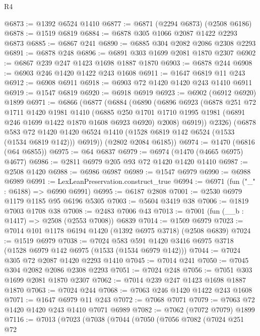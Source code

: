 \begin{lexlean}{R4}
\begin{coremodule}
@6873 := @1392 @6524 @1410
@6877 := @6871 (@2294 @6873) (@2508 @6186)
@6878 := @1519 @6819
@6884 := @6878 @305 @1066 @2087 @1422 @2293 @6873
@6885 := @6867 @241
@6890 := @6885 @304 @2082 @2086 @2308 @2293
@6891 := @6878 @248
@6896 := @6891 @303 @1699 @2081 @1870 @2307
@6902 := @6867 @239 @247 @1423 @1698 @1887 @1870
@6903 := @6878 @244
@6908 := @6903 @246 @1420 @1422 @243 @1608
@6911 := @1647 @6819 @11 @243
@6912 := @6908 @6911
@6918 := @6903 @72 @1420 @1420 @243 @1410 @6911
@6919 := @1547 @6819
@6920 := @6918 @6919
@6923 := @6902 (@6912 @6920) @1899
@6971 := @6866
    (@6877
      (@6884
        (@6890
          (@6896
            @6923
            (@6878
              @251
              @72
              @1711
              @1420
              @1981
              @1410
              (@6885
                @250
                @1701
                @1710
                @1995
                @1981
                (@6891 @246 @1699 @1422 @1870 @1608 @6923 @6920)
                @2008)
              @6919))
          @2326)
        (@6878
          @583
          @72
          @1420
          @1420
          @6524
          @1410
          (@1528 @6819 @142 @6524 (@1533 (@1534 @6819 @142)))
          @6919))
      (@2802 @2084 @6185))
@6974 := @1470 (@6816 (@64 @6855))
@6975 := @64 @6837
@6979 := @6974 (@1470 (@4665 @6975) @4677)
@6986 := @2811 @6979 @205 @93 @72 @1420 @1420 @1410
@6987 := @2508 @1420
@6988 := @6986 @6987
@6989 := @1547 @6979
@6990 := @6988 @6989
@6991 := LexLeanPreservation.construct_true
@6994 := @6971 (fun ("_" : @6188) => @6990 @6991)
@6995 := @6187 @2808
@7001 := @2530 @6979 @1179 @1185 @95 @6196 @5305
@7003 := @5604 @3419 @38
@7006 := @1819 @7003 @1708 @38
@7008 := @2483 @7006 @43
@7013 := @7001 (fun (__b : @1417) => @2508 (@2553 @7008)) @6839
@7014 := @1509 @6979
@7023 := @7014 @101 @1178 @6194 @1420 (@1392 @6975 @3718) (@2508 @6839)
@7024 := @1519 @6979
@7038 := @7024 @583 @591 @1420 @3416 @6975 @3718 (@1528 @6979 @142 @6975 (@1533 (@1534 @6979 @142)))
@7044 := @7024 @305 @72 @2087 @1420 @2293 @1410
@7045 := @7014 @241
@7050 := @7045 @304 @2082 @2086 @2308 @2293
@7051 := @7024 @248
@7056 := @7051 @303 @1699 @2081 @1870 @2307
@7062 := @7014 @239 @247 @1423 @1698 @1887 @1870
@7063 := @7024 @244
@7068 := @7063 @246 @1420 @1422 @243 @1608
@7071 := @1647 @6979 @11 @243
@7072 := @7068 @7071
@7079 := @7063 @72 @1420 @1420 @243 @1410 @7071 @6989
@7082 := @7062 (@7072 @7079) @1899
@7116 := @7013
    (@7023
      (@7038
        (@7044
          (@7050
            (@7056
              @7082
              (@7024
                @251
                @72

\end{coremodule}
\end{lexlean}
